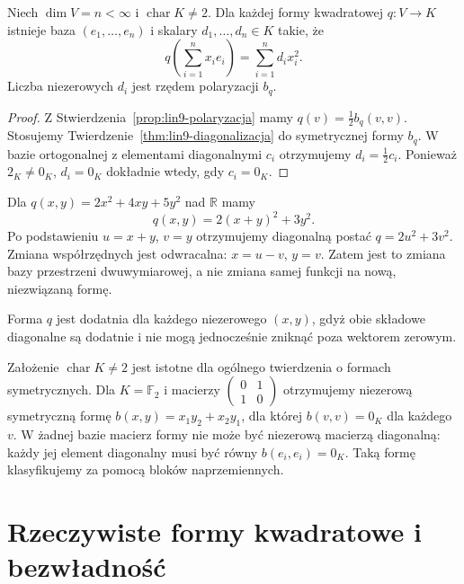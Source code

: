 \begin{wniosek}
\label{cor:lin9-kwadratowa-diagonalna}
Niech \(\dim V=n<\infty\)
i \(\operatorname{char}K\ne2\).
Dla każdej formy
kwadratowej \(q\colon V\to K\)
istnieje baza
\((e_1,\ldots,e_n)\)
i skalary \(d_1,\ldots,d_n\in K\)
takie, że
\[
 q\!\left(\sum_{i=1}^n x_ie_i\right)
 =\sum_{i=1}^n d_ix_i^2.
\]
Liczba niezerowych \(d_i\)
jest rzędem polaryzacji \(b_q\).
\end{wniosek}
\begin{proof}
Z
Stwierdzenia~\ref{prop:lin9-polaryzacja}
mamy \(q(v)=\tfrac12b_q(v,v)\).
Stosujemy
Twierdzenie~\ref{thm:lin9-diagonalizacja}
do symetrycznej formy \(b_q\).
W bazie ortogonalnej
z elementami diagonalnymi
\(c_i\) otrzymujemy
\(d_i=\tfrac12c_i\).
Ponieważ \(2_K\ne0_K\),
\(d_i=0_K\) dokładnie wtedy,
gdy \(c_i=0_K\).
\end{proof}

\begin{przyklad}
\label{prz:lin9-uzupelnienie-kwadratu}
Dla \(q(x,y)=2x^2+4xy+5y^2\)
nad \(\mathbb R\) mamy
\[
 q(x,y)=2(x+y)^2+3y^2.
\]
Po podstawieniu
\(u=x+y\), \(v=y\)
otrzymujemy diagonalną
postać \(q=2u^2+3v^2\).
Zmiana współrzędnych jest
odwracalna:
\(x=u-v\), \(y=v\).
Zatem jest to zmiana bazy
przestrzeni dwuwymiarowej,
a nie zmiana samej funkcji
na nową, niezwiązaną formę.

Forma \(q\) jest dodatnia
dla każdego niezerowego
\((x,y)\), gdyż obie składowe
diagonalne są dodatnie
i nie mogą jednocześnie
zniknąć poza wektorem zerowym.
\end{przyklad}

\begin{uwaga}
\label{rem:lin9-diagonalizacja-char2}
Założenie
\(\operatorname{char}K\ne2\)
jest istotne dla ogólnego
twierdzenia o formach
symetrycznych.
Dla \(K=\mathbb F_2\)
i macierzy
\(\begin{pmatrix}0&1\\1&0\end{pmatrix}\)
otrzymujemy niezerową
symetryczną formę
\(b(x,y)=x_1y_2+x_2y_1\),
dla której \(b(v,v)=0_K\)
dla każdego \(v\).
W żadnej bazie macierz formy
nie może być niezerową
macierzą diagonalną:
każdy jej element diagonalny
musi być równy \(b(e_i,e_i)=0_K\).
Taką formę klasyfikujemy
za pomocą bloków naprzemiennych.
\end{uwaga}

\section{Rzeczywiste formy kwadratowe i bezwładność}
\label{sec:lin9-bezwladnosc}

